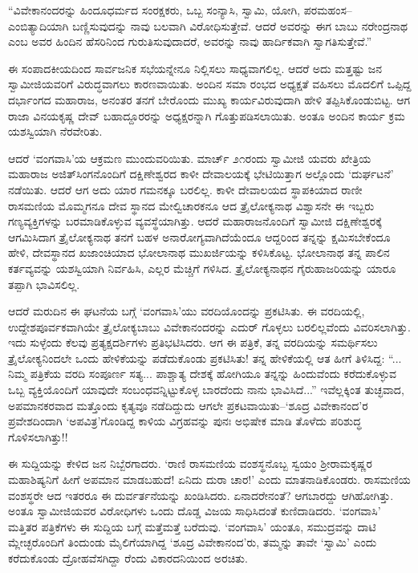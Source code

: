 “ವಿವೇಕಾನಂದರನ್ನು ಹಿಂದೂಧರ್ಮದ ಸಂರಕ್ಷಕರು, ಒಬ್ಬ ಸಂನ್ಯಾಸಿ, ಸ್ವಾಮಿ, ಯೋಗಿ, ಪರಮಹಂಸ–ಎಂಬಿತ್ಯಾದಿಯಾಗಿ ಬಣ್ಣಿಸುವುದನ್ನು ನಾವು ಬಲವಾಗಿ ವಿರೋಧಿಸುತ್ತೇವೆ. ಆದರೆ ಅವರನ್ನು ಈಗ ಬಾಬು ನರೇಂದ್ರನಾಥ ಎಂಬ ಅವರ ಹಿಂದಿನ ಹೆಸರಿನಿಂದ ಗುರುತಿಸುವುದಾದರೆ, ಅವರನ್ನು ನಾವು ಹಾರ್ದಿಕವಾಗಿ ಸ್ವಾಗತಿಸುತ್ತೇವೆ.”

ಈ ಸಂಪಾದಕೀಯದಿಂದ ಸಾರ್ವಜನಿಕ ಸಭೆಯನ್ನೇನೂ ನಿಲ್ಲಿಸಲು ಸಾಧ್ಯವಾಗಲಿಲ್ಲ. ಆದರೆ ಅದು ಮತ್ತಷ್ಟು ಜನ ಸ್ವಾಮೀಜಿಯವರಿಗೆ ವಿರುದ್ಧವಾಗಲು ಕಾರಣವಾಯಿತು. ಅಂದಿನ ಸಮಾ ರಂಭದ ಅಧ್ಯಕ್ಷತೆ ವಹಿಸಲು ಮೊದಲಿಗೆ ಒಪ್ಪಿದ್ದ ದರ್ಭಾಂಗದ ಮಹಾರಾಜ, ಅನಂತರ ತನಗೆ ಬೇರೊಂದು ಮುಖ್ಯ ಕಾರ್ಯವಿರುವುದಾಗಿ ಹೇಳಿ ತಪ್ಪಿಸಿಕೊಂಡುಬಿಟ್ಟ. ಆಗ ರಾಜಾ ವಿನಯಕೃಷ್ಣ ದೇವ್ ಬಹಾದ್ದೂರರನ್ನು ಅಧ್ಯಕ್ಷರನ್ನಾಗಿ ಗೊತ್ತುಪಡಿಸಲಾಯಿತು. ಅಂತೂ ಅಂದಿನ ಕಾರ್ಯ ಕ್ರಮ ಯಶಸ್ವಿಯಾಗಿ ನೆರವೇರಿತು.

ಆದರೆ ‘ವಂಗವಾಸಿ’ಯ ಆಕ್ರಮಣ ಮುಂದುವರಿಯಿತು. ಮಾರ್ಚ್ ೨೧ರಂದು ಸ್ವಾಮೀಜಿ ಯವರು ಖೇತ್ರಿಯ ಮಹಾರಾಜ ಅಜಿತ್​ಸಿಂಗನೊಂದಿಗೆ ದಕ್ಷಿಣೇಶ್ವರದ ಕಾಳೀ ದೇವಾಲಯಕ್ಕೆ ಭೇಟಿಯಿತ್ತಾಗ ಅಲ್ಲೊಂದು ‘ದುರ್ಘಟನೆ’ ನಡೆಯಿತು. ಆದರೆ ಆಗ ಅದು ಯಾರ ಗಮನಕ್ಕೂ ಬರಲಿಲ್ಲ. ಕಾಳೀ ದೇವಾಲಯದ ಸ್ಥಾಪಕಿಯಾದ ರಾಣೀ ರಾಸಮಣಿಯ ಮೊಮ್ಮಗನೂ ದೇವ ಸ್ಥಾನದ ಮೇಲ್ವಿಚಾರಕನೂ ಆದ ತ್ರೈಲೋಕ್ಯನಾಥ ವಿಶ್ವಾಸನೇ ಈ ಇಬ್ಬರು ಗಣ್ಯವ್ಯಕ್ತಿಗಳನ್ನು ಬರಮಾಡಿಕೊಳ್ಳುವ ವ್ಯವಸ್ಥೆಯಾಗಿತ್ತು. ಆದರೆ ಮಹಾರಾಜನೊಂದಿಗೆ ಸ್ವಾಮೀಜಿ ದಕ್ಷಿಣೇಶ್ವರಕ್ಕೆ ಆಗಮಿಸಿದಾಗ ತ್ರೈಲೋಕ್ಯನಾಥ ತನಗೆ ಬಹಳ ಅನಾರೋಗ್ಯವಾಗಿದೆಯೆಂದೂ ಆದ್ದರಿಂದ ತನ್ನನ್ನು ಕ್ಷಮಿಸಬೇಕೆಂದೂ ಹೇಳಿ, ದೇವಸ್ಥಾನದ ಖಜಾಂಚಿಯಾದ ಭೋಲಾನಾಥ ಮುಖರ್ಜಿಯನ್ನು ಕಳಿಸಿಕೊಟ್ಟ. ಭೋಲಾನಾಥ ತನ್ನ ಪಾಲಿನ ಕರ್ತವ್ಯವನ್ನು ಯಶಸ್ವಿಯಾಗಿ ನಿರ್ವಹಿಸಿ, ಎಲ್ಲರ ಮೆಚ್ಚಿಗೆ ಗಳಿಸಿದ. ತ್ರೈಲೋಕ್ಯನಾಥನ ಗೈರುಹಾಜರಿಯನ್ನು ಯಾರೂ ತಪ್ಪಾಗಿ ಭಾವಿಸಲಿಲ್ಲ.

ಆದರೆ ಮರುದಿನ ಈ ಘಟನೆಯ ಬಗ್ಗೆ ‘ವಂಗವಾಸಿ’ಯು ವರದಿಯೊಂದನ್ನು ಪ್ರಕಟಿಸಿತು. ಈ ವರದಿಯಲ್ಲಿ, ಉದ್ದೇಶಪೂರ್ವಕವಾಗಿಯೇ ತ್ರೈಲೋಕ್ಯಬಾಬು ವಿವೇಕಾನಂದರನ್ನು ಎದುರ್ ಗೊಳ್ಳಲು ಬರಲಿಲ್ಲವೆಂದು ವಿವರಿಸಲಾಗಿತ್ತು. ಇದು ಸುಳ್ಳೆಂದು ಕೆಲವು ಪ್ರತ್ಯಕ್ಷದರ್ಶಿಗಳು ಪ್ರತಿಭಟಿಸಿದರು. ಆಗ ಈ ಪತ್ರಿಕೆ, ತನ್ನ ವರದಿಯನ್ನು ಸಮರ್ಥಿಸಲು ತ್ರೈಲೋಕ್ಯನಿಂದಲೇ ಒಂದು ಹೇಳಿಕೆಯನ್ನು ಪಡೆದುಕೊಂಡು ಪ್ರಕಟಿಸಿತು! ತನ್ನ ಹೇಳಿಕೆಯಲ್ಲಿ ಆತ ಹೀಗೆ ತಿಳಿಸಿದ್ದ: “... ನಿಮ್ಮ ಪತ್ರಿಕೆಯ ವರದಿ ಸಂಪೂರ್ಣ ಸತ್ಯ... ಪಾಶ್ಚಾತ್ಯ ದೇಶಕ್ಕೆ ಹೋಗಿಯೂ ತನ್ನನ್ನು ಹಿಂದುವೆಂದು ಕರೆದುಕೊಳ್ಳುವ ಒಬ್ಬ ವ್ಯಕ್ತಿಯೊಂದಿಗೆ ಯಾವುದೇ ಸಂಬಂಧವನ್ನಿಟ್ಟುಕೊಳ್ಳ ಬಾರದೆಂದು ನಾನು ಭಾವಿಸಿದೆ...” ಇವೆಲ್ಲಕ್ಕಿಂತ ತುಚ್ಛವಾದ, ಅಪಮಾನಕರವಾದ ಮತ್ತೊಂದು ಕೃತ್ಯವೂ ನಡೆದಿದ್ದುದು ಆಗಲೇ ಪ್ರಕಟವಾಯಿತು–‘ಶೂದ್ರ ವಿವೇಕಾನಂದ’ರ ಪ್ರವೇಶದಿಂದಾಗಿ ‘ಅಪವಿತ್ರ’ಗೊಂಡಿದ್ದ ಕಾಳಿಯ ವಿಗ್ರಹವನ್ನು ಪುನಃ ಅಭಿಷೇಕ ಮಾಡಿ ತೊಳೆದು ಪರಿಶುದ್ಧ ಗೊಳಿಸಲಾಗಿತ್ತು!!

ಈ ಸುದ್ದಿಯನ್ನು ಕೇಳಿದ ಜನ ನಿಬ್ಬೆರಗಾದರು. ‘ರಾಣಿ ರಾಸಮಣಿಯ ವಂಶಸ್ಥನೊಬ್ಬ ಸ್ವಯಂ ಶ್ರೀರಾಮಕೃಷ್ಣರ ಮಹಾಶಿಷ್ಯನಿಗೆ ಹೀಗೆ ಅಪಮಾನ ಮಾಡಬಹುದೆ! ಏನಿದು ದುರಾ ಚಾರ!’ ಎಂದು ಮಾತನಾಡಿಕೊಂಡರು. ರಾಸಮಣಿಯ ವಂಶಸ್ಥರೇ ಆದ ಇತರರೂ ಈ ದುರ್ವರ್ತನೆಯನ್ನು ಖಂಡಿಸಿದರು. ಏನಾದರೇನಂತೆ? ಆಗಬಾರದ್ದು ಆಗಿಹೋಗಿತ್ತು. ಅಂತೂ ಸ್ವಾಮೀಜಿಯವರ ವಿರೋಧಿಗಳು ಒಂದು ದೊಡ್ಡ ವಿಜಯ ಸಾಧಿಸಿದಂತೆ ಕುಣಿದಾಡಿದರು. ‘ವಂಗವಾಸಿ’ ಮತ್ತಿತರ ಪತ್ರಿಕೆಗಳು ಈ ಸುದ್ದಿಯ ಬಗ್ಗೆ ಮತ್ತೆಮತ್ತೆ ಬರೆದುವು. ‘ವಂಗವಾಸಿ’ ಯಂತೂ, ಸಮುದ್ರವನ್ನು ದಾಟಿ ಮ್ಲೇಚ್ಛರೊಂದಿಗೆ ತಿಂದುಂಡು ಮೈಲಿಗೆಯಾಗಿದ್ದ ‘ಶೂದ್ರ ವಿವೇಕಾನಂದ’ರು, ತಮ್ಮನ್ನು ತಾವೇ ‘ಸ್ವಾಮಿ’ ಎಂದು ಕರೆದುಕೊಂಡು ದ್ರೋಹವೆಸಗಿದ್ದಾ ರೆಂದು ವಿಕಾರದನಿಯಿಂದ ಅರಚಿತು.


